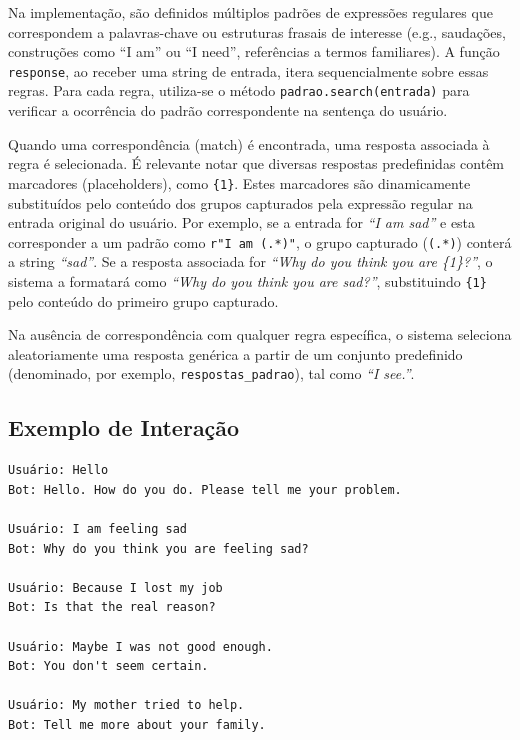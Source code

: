 \documentclass[a4paper,oneside]{book}
\begin{document}
Na implementação, são definidos múltiplos padrões de expressões regulares que correspondem a palavras-chave ou estruturas frasais de interesse (e.g., saudações, construções como ``I am'' ou ``I need'', referências a termos familiares). A função \texttt{response}, ao receber uma string de entrada, itera sequencialmente sobre essas regras. Para cada regra, utiliza-se o método \texttt{padrao.search(entrada)} para verificar a ocorrência do padrão correspondente na sentença do usuário.

Quando uma correspondência (match) é encontrada, uma resposta associada à regra é selecionada. É relevante notar que diversas respostas predefinidas contêm marcadores (placeholders), como \texttt{\{1\}}. Estes marcadores são dinamicamente substituídos pelo conteúdo dos grupos capturados pela expressão regular na entrada original do usuário. Por exemplo, se a entrada for \textit{``I am sad''} e esta corresponder a um padrão como \texttt{r"I am (.*)"}, o grupo capturado (\texttt{(.*)}) conterá a string \textit{``sad''}. Se a resposta associada for \textit{``Why do you think you are \{1\}?''}, o sistema a formatará como \textit{``Why do you think you are sad?''}, substituindo \texttt{\{1\}} pelo conteúdo do primeiro grupo capturado.

Na ausência de correspondência com qualquer regra específica, o sistema seleciona aleatoriamente uma resposta genérica a partir de um conjunto predefinido (denominado, por exemplo, \texttt{respostas\_padrao}), tal como \textit{``I see.''}.

\subsection{Exemplo de Interação}

\begin{verbatim}
Usuário: Hello
Bot: Hello. How do you do. Please tell me your problem.

Usuário: I am feeling sad
Bot: Why do you think you are feeling sad?

Usuário: Because I lost my job
Bot: Is that the real reason?

Usuário: Maybe I was not good enough.
Bot: You don't seem certain.

Usuário: My mother tried to help.
Bot: Tell me more about your family.
\end{verbatim}
\end{document}
